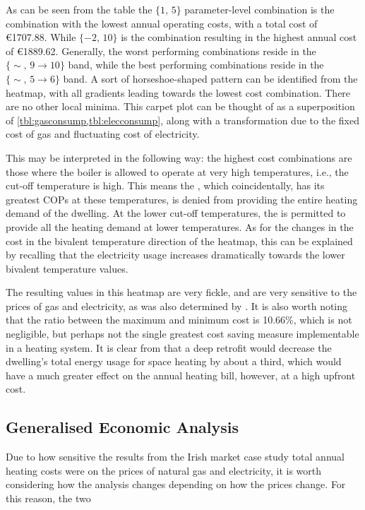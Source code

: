 As can be seen from the table the $\{1\text{, }5\}$ parameter-level combination is the combination with the lowest annual operating costs, with a total cost of €1707.88. While $\{-2\text{, }10\}$ is the combination resulting in the highest annual cost of €1889.62. Generally, the worst performing combinations reside in the $\{\sim\text{, }9\rightarrow10\}$ band, while the best performing combinations reside in the $\{\sim\text{, }5\rightarrow6\}$ band. A sort of horseshoe-shaped pattern can be identified from the heatmap, with all gradients leading towards the lowest cost combination. There are no other local minima. This carpet plot can be thought of as a superposition of \cref{tbl:gasconsump,tbl:elecconsump}, along with a transformation due to the fixed cost of gas and fluctuating cost of electricity. 

This may be interpreted in the following way: the highest cost combinations are those where the boiler is allowed to operate at very high temperatures, i.e., the cut-off temperature is high. This means the \HP, which coincidentally, has its greatest \acp{COP} at these temperatures, is denied from providing the entire heating demand of the dwelling. At the lower cut-off temperatures, the \HP is permitted to provide all the heating demand at lower temperatures. As for the changes in the cost in the bivalent temperature direction of the heatmap, this can be explained by recalling that the electricity usage increases dramatically towards the lower bivalent temperature values. 

The resulting values in this heatmap are very fickle, and are very sensitive to the prices of gas and electricity, as was also determined by \citeauthor{rauschkolb_cost-optimal_2020} \cite{rauschkolb_cost-optimal_2020}. It is also worth noting that the ratio between the maximum and minimum cost is 10.66\%, which is not negligible, but perhaps not the single greatest cost saving measure implementable in a heating system. It is clear from \citeauthor{keogh_technical_2018} \cite{keogh_technical_2018} that a deep retrofit would decrease the dwelling's total energy usage for space heating by about a third, which would have a much greater effect on the annual heating bill, however, at a high upfront cost.

\subsection{Generalised Economic Analysis}
Due to how sensitive the results from the Irish market case study total annual heating costs were on the prices of natural gas and electricity, it is worth considering how the analysis changes depending on how the prices change. For this reason, the two 





